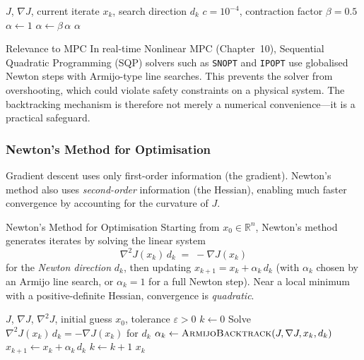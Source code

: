 \begin{algorithm}[H]
\caption{Armijo Backtracking Line Search}\label{alg:armijo}
\begin{algorithmic}[1]
\Require $J$, $\nabla J$, current iterate $x_k$, search direction $d_k$
\Require $c = 10^{-4}$, contraction factor $\beta = 0.5$
\State $\alpha \gets 1$
    \State $\alpha \gets \beta\,\alpha$
\EndWhile
\State \Return $\alpha$
\end{algorithmic}
\end{algorithm}

\begin{notebox}{Relevance to MPC}
	In real-time Nonlinear MPC (Chapter~10), Sequential Quadratic Programming (SQP) solvers such as \texttt{SNOPT} and \texttt{IPOPT} use globalised Newton steps with Armijo-type line searches. This prevents the solver from overshooting, which could violate safety constraints on a physical system. The backtracking mechanism is therefore not merely a numerical convenience---it is a practical safeguard.
\end{notebox}

\subsubsection{Newton's Method for Optimisation}

Gradient descent uses only first-order information (the gradient). Newton's method also uses \emph{second-order} information (the Hessian), enabling much faster convergence by accounting for the curvature of $J$.

\begin{defnbox}{Newton's Method for Optimisation}
	Starting from $x_0\in\mathbb{R}^n$, Newton's method generates iterates by solving the linear system
	\[
	\nabla^2 J(x_k)\, d_k \;=\; -\nabla J(x_k)
	\]
	for the \emph{Newton direction} $d_k$, then updating $x_{k+1}=x_k+\alpha_k\, d_k$ (with $\alpha_k$ chosen by an Armijo line search, or $\alpha_k=1$ for a full Newton step). Near a local minimum with a positive-definite Hessian, convergence is \emph{quadratic}.
\end{defnbox}

\begin{algorithm}[H]
\caption{Newton's Method for Optimisation}\label{alg:newton_opt}
\begin{algorithmic}[1]
\Require $J$, $\nabla J$, $\nabla^2 J$, initial guess $x_0$, tolerance $\varepsilon>0$
\State $k \gets 0$
    \State Solve $\nabla^2 J(x_k)\, d_k = -\nabla J(x_k)$ for $d_k$
    \State $\alpha_k \gets \textsc{ArmijoBacktrack}(J, \nabla J, x_k, d_k)$
    \State $x_{k+1} \gets x_k + \alpha_k\, d_k$
    \State $k \gets k+1$
\EndWhile
\State \Return $x_k$
\end{algorithmic}
\end{algorithm}

